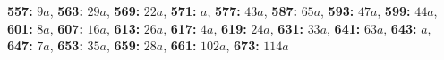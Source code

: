 \textsf{\bfseries 557:} $9a$, \textsf{\bfseries 563:} $29a$, \textsf{\bfseries 569:} $22a$, \textsf{\bfseries 571:} $a$, \textsf{\bfseries 577:} $43a$, \textsf{\bfseries 587:} $65a$, \textsf{\bfseries 593:} $47a$, \textsf{\bfseries 599:} $44a$, \textsf{\bfseries 601:} $8a$, \textsf{\bfseries 607:} $16a$, \textsf{\bfseries 613:} $26a$, \textsf{\bfseries 617:} $4a$, \textsf{\bfseries 619:} $24a$, \textsf{\bfseries 631:} $33a$, \textsf{\bfseries 641:} $63a$, \textsf{\bfseries 643:} $a$, \textsf{\bfseries 647:} $7a$, \textsf{\bfseries 653:} $35a$, \textsf{\bfseries 659:} $28a$, \textsf{\bfseries 661:} $102a$, \textsf{\bfseries 673:} $114a$